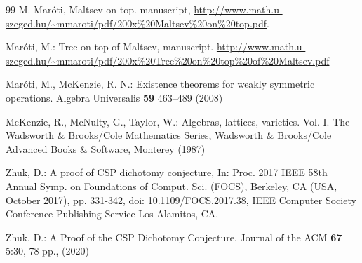 \documentclass[11pt]{amsart}
\theoremstyle{definition}
\begin{document}
\begin{thebibliography}{99}
	M. Mar\'{o}ti,
	Maltsev on top.
	manuscript,
	\url{http://www.math.u-szeged.hu/~mmaroti/pdf/200x%20Maltsev%20on%20top.pdf}.

	Mar\'{o}ti, M.:
	Tree on top of Maltsev, manuscript.
	\url{http://www.math.u-szeged.hu/~mmaroti/pdf/200x%20Tree%20on%20top%20of%20Maltsev.pdf}

	Mar\'{o}ti, M., McKenzie, R. N.:
	Existence theorems for weakly symmetric operations.
	Algebra Universalis
	{\bf 59}
	463--489
	(2008)

	McKenzie, R., McNulty, G., Taylor, W.:
	Algebras, lattices, varieties. Vol. I.
	The Wadsworth \& Brooks/Cole Mathematics Series,
	Wadsworth \& Brooks/Cole Advanced Books \& Software, Monterey (1987)

 Zhuk, D.: 
	A proof of CSP dichotomy conjecture, 
	In: Proc. 2017 IEEE 58th Annual Symp. on Foundations of Comput. Sci. (FOCS),
	Berkeley, CA (USA, October 2017),
	pp. 331-342, doi: 10.1109/FOCS.2017.38,
	IEEE Computer Society Conference Publishing Service
	Los Alamitos, CA.

 Zhuk, D.:
	A Proof of the CSP Dichotomy Conjecture,
	Journal of the ACM 
	{\bf 67} 5:30,
	78 pp., 
	(2020)
\end{thebibliography}
\end{document}
